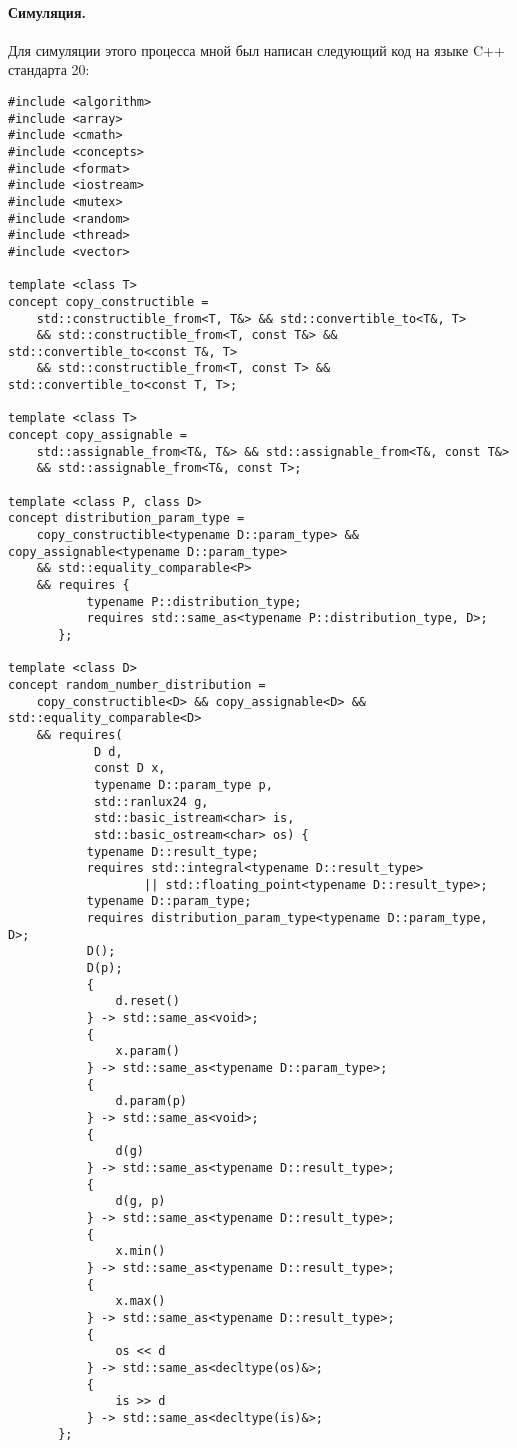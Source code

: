 \documentclass{article}
\begin{document}
    \paragraph{Симуляция.}
    Для симуляции этого процесса мной был написан следующий код на языке C++ стандарта 20:
    \begin{verbatim}
#include <algorithm>
#include <array>
#include <cmath>
#include <concepts>
#include <format>
#include <iostream>
#include <mutex>
#include <random>
#include <thread>
#include <vector>

template <class T>
concept copy_constructible =
    std::constructible_from<T, T&> && std::convertible_to<T&, T>
    && std::constructible_from<T, const T&> && std::convertible_to<const T&, T>
    && std::constructible_from<T, const T> && std::convertible_to<const T, T>;

template <class T>
concept copy_assignable =
    std::assignable_from<T&, T&> && std::assignable_from<T&, const T&>
    && std::assignable_from<T&, const T>;

template <class P, class D>
concept distribution_param_type =
    copy_constructible<typename D::param_type> && copy_assignable<typename D::param_type>
    && std::equality_comparable<P>
    && requires {
           typename P::distribution_type;
           requires std::same_as<typename P::distribution_type, D>;
       };

template <class D>
concept random_number_distribution =
    copy_constructible<D> && copy_assignable<D> && std::equality_comparable<D>
    && requires(
            D d,
            const D x,
            typename D::param_type p,
            std::ranlux24 g,
            std::basic_istream<char> is,
            std::basic_ostream<char> os) {
           typename D::result_type;
           requires std::integral<typename D::result_type>
                   || std::floating_point<typename D::result_type>;
           typename D::param_type;
           requires distribution_param_type<typename D::param_type, D>;
           D();
           D(p);
           {
               d.reset()
           } -> std::same_as<void>;
           {
               x.param()
           } -> std::same_as<typename D::param_type>;
           {
               d.param(p)
           } -> std::same_as<void>;
           {
               d(g)
           } -> std::same_as<typename D::result_type>;
           {
               d(g, p)
           } -> std::same_as<typename D::result_type>;
           {
               x.min()
           } -> std::same_as<typename D::result_type>;
           {
               x.max()
           } -> std::same_as<typename D::result_type>;
           {
               os << d
           } -> std::same_as<decltype(os)&>;
           {
               is >> d
           } -> std::same_as<decltype(is)&>;
       };


\end{verbatim}
\end{document}
